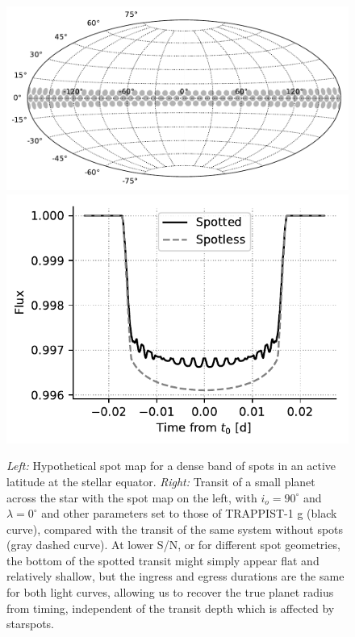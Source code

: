 \begin{figure}%
    \centering
    \includegraphics[scale=0.5]{robin/spot_map.pdf}
    \includegraphics[scale=0.6]{robin/transit_quad.pdf}
    \caption{\textsl{Left:} Hypothetical spot map for a dense band of spots in an active latitude at the stellar equator. \textsl{Right:} Transit of a small planet across the star with the spot map on the left, with $i_o = 90^\circ$ and $\lambda = 0^\circ$ and other parameters set to those of TRAPPIST-1 g (black curve), compared with the transit of the same system without spots (gray dashed curve). At lower S/N, or for different spot geometries, the bottom of the spotted transit might simply appear flat and relatively shallow, but the ingress and egress durations are the same for both light curves, allowing us to recover the true planet radius from timing, independent of the transit depth which is affected by starspots.}
    \label{fig:map}
\end{figure}

